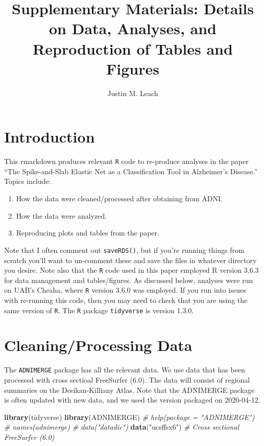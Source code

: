 \documentclass[
]{article}
\title{Supplementary Materials: Details on Data, Analyses, and Reproduction of
Tables and Figures}
\author{Justin M. Leach}
\date{}
\newenvironment{Shaded}{\begin{snugshade}}{\end{snugshade}}
\newcommand{\CommentTok}[1]{\textcolor[rgb]{0.56,0.35,0.01}{\textit{#1}}}
\newcommand{\KeywordTok}[1]{\textcolor[rgb]{0.13,0.29,0.53}{\textbf{#1}}}
\newcommand{\NormalTok}[1]{#1}
\newcommand{\StringTok}[1]{\textcolor[rgb]{0.31,0.60,0.02}{#1}}
\providecommand{\tightlist}{%
  \setlength{\itemsep}{0pt}\setlength{\parskip}{0pt}}
\begin{document}
\maketitle

\hypertarget{introduction}{%
\section{Introduction}\label{introduction}}

This rmarkdown produces relevant \texttt{R} code to re-produce analyses
in the paper ``The Spike-and-Slab Elastic Net as a Classification Tool
in Alzheimer's Disease.'' Topics include:

\begin{enumerate}
\def\labelenumi{(\arabic{enumi})}
\tightlist
\item
  How the data were cleaned/processed after obtaining from ADNI.
\item
  How the data were analyzed.
\item
  Reproducing plots and tables from the paper.
\end{enumerate}

Note that I often comment out \texttt{saveRDS()}, but if you're running
things from scratch you'll want to un-comment these and save the files
in whatever directory you desire. Note also that the \texttt{R} code
used in this paper employed R version 3.6.3 for data management and
tables/figures. As discussed below, analyses were run on UAB's Cheaha,
where \texttt{R} version 3.6.0 was employed. If you run into issues with
re-running this code, then you may need to check that you are using the
same version of \texttt{R}. The \texttt{R} package \texttt{tidyverse} is
version 1.3.0.

\hypertarget{cleaningprocessing-data}{%
\section{Cleaning/Processing Data}\label{cleaningprocessing-data}}

The \texttt{ADNIMERGE} package has all the relevant data. We use data
that has been processed with cross sectioal FreeSurfer (6.0). The data
will consist of regional summaries on the Desikan-Killiany Atlas. Note
that the ADNIMERGE package is often updated with new data, and we used
the version packaged on 2020-04-12.

\begin{Shaded}
\begin{Highlighting}[]
\KeywordTok{library}\NormalTok{(tidyverse)}
\KeywordTok{library}\NormalTok{(ADNIMERGE)}
\CommentTok{# help(package = "ADNIMERGE")}
\CommentTok{# names(adnimerge)}
\CommentTok{# data("datadic")}
\KeywordTok{data}\NormalTok{(}\StringTok{"ucsffsx6"}\NormalTok{) }\CommentTok{# Cross sectional FreeSurfer (6.0)}
\end{Highlighting}
\end{Shaded}
\end{document}
